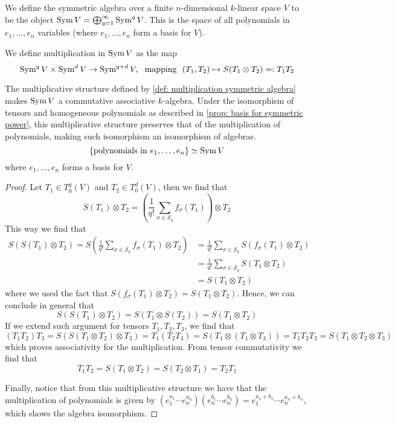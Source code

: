 \begin{definition}
  We define the symmetric algebra over a finite \(n\)-dimensional \(k\)-linear
  space \(V\) to be the object \(\operatorname{Sym} V = \bigoplus_{q=1}^\infty \operatorname{Sym}^q V\).
  This is the space of all polynomials in \(e_1, \dots, e_n\) variables (where
  \(e_1, \dots, e_n\) form a basis for \(V\)).

  We define multiplication in \(\operatorname{Sym} V\) as the map
  \begin{equation}\label{def: multiplication symmetric algebra}
    \operatorname{Sym}^q V \times \operatorname{Sym}^d V \to \operatorname{Sym}^{q + d} V,\ \text{ mapping }\
    (T_1, T_2) \mapsto S(T_1 \otimes T_2) =: T_1 T_2
  \end{equation}
\end{definition}

\begin{proposition}
  The multiplicative structure defined by \cref{def: multiplication symmetric
  algebra} makes \(\operatorname{Sym} V\) a commutative associative \(k\)-algebra. Under the
  isomorphism of tensors and homogeneous polynomials as described in
  \cref{prop: basis for symmetric power}, this multiplicative structure
  preserves that of the multiplication of polynomials, making such isomorphism
  an isomorphism of algebras.
  \[
    \{\text{polynomials in } e_1, \dots, e_n\} \simeq \operatorname{Sym} V
  \]
  where \(e_1, \dots, e_n\) forms a basis for \(V\).
\end{proposition}

\begin{proof}
  Let \(T_1 \in T_0^q(V)\) and \(T_2 \in T_0^d(V)\), then we find that
  \[
    S(T_1) \otimes T_2 = \left( \frac{1}{q!} \sum_{\sigma \in \mathcal S_q}
    f_\sigma(T_1) \right) \otimes T_2
  \]
  This way we find that
  \begin{align*}
    S(S(T_1) \otimes T_2) = S \left( \frac{1}{q!} \sum_{\sigma \in \mathcal S_q}
    f_\sigma(T_1) \otimes T_2 \right)
    &= \frac{1}{q!} \sum_{\sigma \in \mathcal S_q} S(f_\sigma(T_1) \otimes T_2)
    \\
    &= \frac{1}{q!} \sum_{\sigma \in \mathcal S_q} S(T_1 \otimes T_2) \\
    &= S(T_1 \otimes T_2)
  \end{align*}
  where we used the fact that \(S(f_\sigma(T_1) \otimes T_2) = S(T_1 \otimes
  T_2)\). Hence, we can conclude in general that
  \[
    S(S(T_1) \otimes T_2) = S(T_1 \otimes S(T_2)) = S(T_1 \otimes T_2)
  \]
  If we extend such argument for tensors \(T_1, T_2, T_3\), we find that
  \[
    (T_1 T_2) T_3 = S(S(T_1 \otimes T_2) \otimes T_3)
    = T_1 (T_2 T_3) = S(T_1 \otimes (T_1 \otimes T_3))
    = T_1 T_2 T_3 = S(T_1 \otimes T_2 \otimes T_3)
  \]
  which proves associativity for the multiplication. From tensor commutativity
  we find that
  \[
    T_1 T_2 = S(T_1 \otimes T_2) = S(T_2 \otimes T_1) = T_2 T_1
  \]

  Finally, notice that from this multiplicative structure we have that the
  multiplication of polynomials is given by \((e_1^{a_1} \cdots
  e_n^{a_n}) (e_n^{b_1} \cdots e_n^{b_n}) = e_1^{a_1 + b_1} \cdots e_n^{a_n +
  b_n}\), which shows the algebra isomorphism.
\end{proof}
